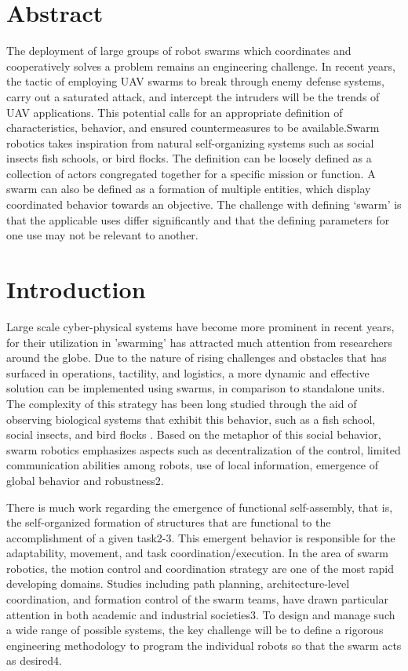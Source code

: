 \section*{Abstract}
The deployment of large groups of robot swarms which coordinates and cooperatively solves a problem remains an engineering challenge. In recent years, the tactic of employing UAV swarms to break through enemy defense systems, carry out a saturated attack, and intercept the intruders will be the trends of UAV applications. This potential calls for an appropriate definition of characteristics, behavior, and ensured countermeasures to be available.Swarm robotics takes inspiration from natural self-organizing systems such as social insects fish schools, or bird flocks. The definition can be loosely defined as a collection of actors congregated together for a specific mission or function. A swarm can also be defined as a formation of multiple entities, which display coordinated behavior towards an objective. The challenge with defining ‘swarm’ is that the applicable uses differ significantly and that the defining parameters for one use may not be relevant to another. 


\section*{Introduction}

Large scale cyber-physical systems have become more prominent in recent years, for their utilization in ’swarming’ has attracted much attention from researchers around the globe. Due to the nature of rising challenges and obstacles that has surfaced in operations, tactility, and logistics, a more dynamic and effective solution can be implemented using swarms, in comparison to standalone units. The complexity of this strategy has been long studied through the aid of observing biological systems that exhibit this behavior, such as a fish school, social insects, and bird flocks \cite{1}. Based on the metaphor of this social behavior, swarm robotics emphasizes aspects such as decentralization of the control, limited communication abilities among robots, use of local information, emergence of global behavior and robustness2.

There is much work regarding the emergence of functional self-assembly, that is, the self-organized formation of structures that are functional to the accomplishment of a given task2-3. This emergent behavior is responsible for the adaptability, movement, and task coordination/execution. In the area of swarm robotics, the motion control and coordination strategy are one of the most rapid developing domains. Studies including path planning, architecture-level coordination, and formation control of the swarm teams, have drawn particular attention in both academic and industrial societies3. To design and manage such a wide range of possible systems, the key challenge will be to define a rigorous engineering methodology to program the individual robots so that the swarm acts as desired4.

